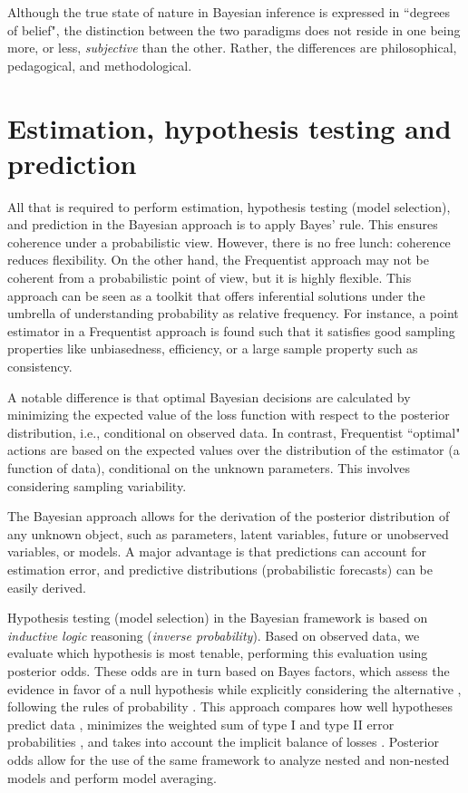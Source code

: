 Although the true state of nature in Bayesian inference is expressed in ``degrees of belief", the distinction between the two paradigms does not reside in one being more, or less, \textit{subjective} than the other. Rather, the differences are philosophical, pedagogical, and methodological.

\section{Estimation, hypothesis testing and prediction}\label{sec23}

All that is required to perform estimation, hypothesis testing (model selection), and prediction in the Bayesian approach is to apply Bayes' rule. This ensures coherence under a probabilistic view. However, there is no free lunch: coherence reduces flexibility. On the other hand, the Frequentist approach may not be coherent from a probabilistic point of view, but it is highly flexible. This approach can be seen as a toolkit that offers inferential solutions under the umbrella of understanding probability as relative frequency. For instance, a point estimator in a Frequentist approach is found such that it satisfies good sampling properties like unbiasedness, efficiency, or a large sample property such as consistency.

A notable difference is that optimal Bayesian decisions are calculated by minimizing the expected value of the loss function with respect to the posterior distribution, i.e., conditional on observed data. In contrast, Frequentist ``optimal" actions are based on the expected values over the distribution of the estimator (a function of data), conditional on the unknown parameters. This involves considering sampling variability.

The Bayesian approach allows for the derivation of the posterior distribution of any unknown object, such as parameters, latent variables, future or unobserved variables, or models. A major advantage is that predictions can account for estimation error, and predictive distributions (probabilistic forecasts) can be easily derived.

Hypothesis testing (model selection) in the Bayesian framework is based on \textit{inductive logic} reasoning (\textit{inverse probability}). Based on observed data, we evaluate which hypothesis is most tenable, performing this evaluation using posterior odds. These odds are in turn based on Bayes factors, which assess the evidence in favor of a null hypothesis while explicitly considering the alternative \cite{Kass1995}, following the rules of probability \cite{Lindley2000}. This approach compares how well hypotheses predict data \cite{Goodman1999}, minimizes the weighted sum of type I and type II error probabilities \cite{DeGroot1975,Pericchip}, and takes into account the implicit balance of losses \cite{Jeffreys1961,Bernardo1994}. Posterior odds allow for the use of the same framework to analyze nested and non-nested models and perform model averaging. 

